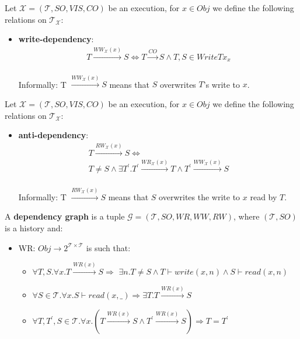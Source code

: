 \documentclass{beamer}
\begin{document}
\begin{frame}
	Let $\mathcal{X} = (\mathcal{T}, SO, VIS, CO)$ be an execution, for $x \in Obj$ we define the following relations on $\mathcal{T}_\mathcal{X}$:
	\begin{itemize}
		\item \textbf{write-dependency}:
		\begin{multline*}
		T \xrightarrow{WW_\mathcal{X}(x)} S \Leftrightarrow T \xrightarrow{CO}S \wedge T,S \in WriteTx_x
		\end{multline*} \\
		Informally: T $ \xrightarrow{WW_\mathcal{X}(x)} S $ means that $S$ overwrites $T$'s write to $x$.
	\end{itemize}
\end{frame}

\begin{frame}
	Let $\mathcal{X} = (\mathcal{T}, SO, VIS, CO)$ be an execution, for $x \in Obj$ we define the following relations on $\mathcal{T}_\mathcal{X}$:
	\begin{itemize}
		\item \textbf{anti-dependency}:
		\begin{multline*}
		T \xrightarrow{RW_\mathcal{X}(x)} S \Leftrightarrow \\
		T \ne S \wedge \exists T^\prime . T^\prime \xrightarrow{WR_\mathcal{X}(x)}T \wedge T^\prime \xrightarrow{WW_\mathcal{X}(x)}S
		\end{multline*} \\
		Informally: T $ \xrightarrow{RW_\mathcal{X}(x)} S $ means that $S$ overwrites the write to $x$ read by $T$.
	\end{itemize}
\end{frame}

\begin{frame}
	A \textbf{dependency graph} is a tuple $\mathcal{G} = (\mathcal{T}, SO, WR, WW, RW)$, where $(\mathcal{T}, SO)$ is a history and:
	\begin{itemize}
		\item WR: $Obj \rightarrow 2^{\mathcal{T} \times \mathcal{T}}$ is such that:
		\begin{itemize}
			\item $\forall T,S. \forall x . T \xrightarrow{WR(x)}S \Rightarrow $ 
				  $	\exists n. T \ne S \wedge T \vdash write(x,n) \wedge S \vdash read(x,n)$
			\item $\forall S \in \mathcal{T}. \forall x. S \vdash read(x,\_) \Rightarrow \exists T. T \xrightarrow{WR(x)} S $
			\item $\forall T, T^\prime, S \in \mathcal{T}. \forall x. \left( T \xrightarrow{WR(x)} S \wedge T^\prime \xrightarrow{WR(x)} S \right) \Rightarrow T = T^\prime $
		\end{itemize}
	\end{itemize}
\end{frame}
\end{document}

